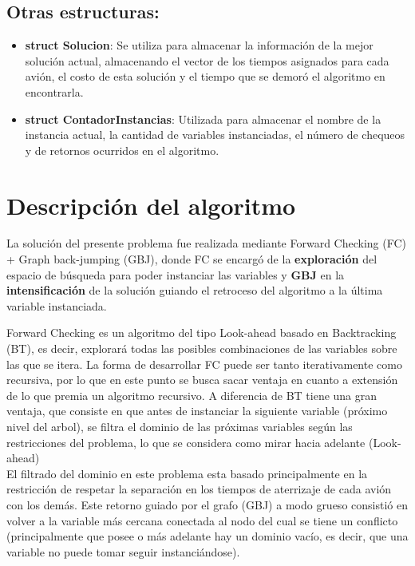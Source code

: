 \documentclass[letter, 10pt]{article}
\begin{document}
\subsection{Otras estructuras:}
\begin{itemize}
    \item \textbf{struct Solucion}: Se utiliza para almacenar la información de la mejor solución actual, almacenando el vector de los tiempos asignados para cada avión, el costo de esta solución y el tiempo que se demoró el algoritmo en encontrarla.
    \item \textbf{struct ContadorInstancias}: Utilizada para almacenar el nombre de la instancia actual, la cantidad de variables instanciadas, el número de chequeos y de retornos ocurridos en el algoritmo.
    
\end{itemize}

\section{Descripción del algoritmo}

La solución del presente problema fue realizada mediante Forward Checking (FC) + Graph back-jumping (GBJ), donde FC se encargó de la \textbf{exploración} del espacio de búsqueda para poder instanciar las variables y \textbf{GBJ} en la \textbf{intensificación} de la solución guiando el retroceso del algoritmo a la última variable instanciada.

Forward Checking es un algoritmo del tipo Look-ahead basado en Backtracking (BT), es decir, explorará todas las posibles combinaciones de las variables sobre las que se itera. La forma de desarrollar FC puede ser tanto iterativamente como recursiva, por lo que en este punto se busca sacar ventaja  en cuanto a extensión de lo que premia un algoritmo recursivo. A diferencia de BT tiene una gran ventaja, que consiste en que antes de instanciar la siguiente variable (próximo nivel del arbol), se filtra el dominio de las próximas variables según las restricciones del problema, lo que se considera como mirar hacia adelante (Look-ahead)\\

El filtrado del dominio en este problema esta basado principalmente en la restricción de respetar la separación en los tiempos de aterrizaje de cada avión con los demás. Este retorno guiado por el grafo (GBJ) a modo grueso consistió en volver a la variable más cercana conectada al nodo del cual se tiene un conflicto (principalmente que posee o más adelante hay un dominio vacío, es decir, que una variable no puede tomar seguir instanciándose).\\
\end{document}
